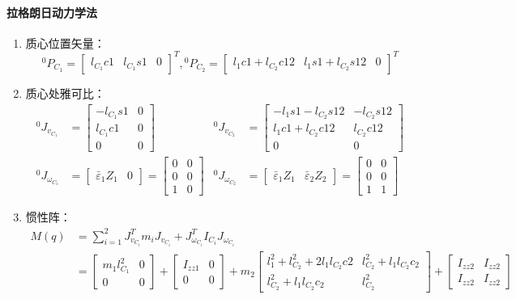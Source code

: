 \documentclass[
12pt, %
a4paper, 
oneside, %
headinclude,footinclude, %
]{scrartcl}
\begin{document}
{\paragraph{拉格朗日动力学法}
\begin{enumerate}
\item 质心位置矢量：
$$ {}^0 P_{C_1} = \begin{bmatrix} l_{C_1}c1 & l_{C_1}s1 & 0 \end{bmatrix}^T, {}^0 P_{C_2} = \begin{bmatrix} l_1 c1 + l_{C_2}c12 & l_1 s1 + l_{C_2}s12 & 0 \end{bmatrix}^T $$
\item 质心处雅可比：
\begin{align*}
{}^0 J_{v_{C_1}} &= \begin{bmatrix} -l_{C_1}s1 & 0 \\ l_{C_1}c1 & 0 \\ 0 & 0 \end{bmatrix}& {}^0 J_{v_{C_2}} &= \begin{bmatrix} -l_1 s1 - l_{C_2}s12 & -l_{C_2}s12 \\ l_1 c1 + l_{C_2}c12 & l_{C_2}c12 \\ 0 & 0 \end{bmatrix} \\
{}^0 J_{\omega_{C_1}} &= \begin{bmatrix} \bar{\varepsilon}_1 Z_1 & 0 \end{bmatrix} = \begin{bmatrix} 0 & 0 \\ 0 & 0 \\ 1 & 0 \end{bmatrix}& {}^0 J_{\omega_{C_2}} &= \begin{bmatrix} \bar{\varepsilon}_1 Z_1 & \bar{\varepsilon}_2 Z_2 \end{bmatrix} = \begin{bmatrix} 0 & 0 \\ 0 & 0 \\ 1 & 1 \end{bmatrix}
\end{align*}
\item 惯性阵：
\begin{align*}
M(q) &= \sum_{i = 1}^{2} J_{v_{C_i}}^T m_i J_{v_{C_i}} + J_{\omega_{C_i}}^T I_{C_i} J_{\omega_{C_i}} \\
&= \begin{bmatrix} m_1l_{C_1}^2 & 0 \\ 0 & 0 \end{bmatrix} + \begin{bmatrix} I_{zz1} & 0 \\ 0 & 0 \end{bmatrix} + m_2 \begin{bmatrix} l_1^2 + l_{C_2}^2 + 2l_1 l_{C_2}c2 & l_{C_2}^2 + l_1 l_{C_2}c_2 \\ l_{C_2}^2 + l_1 l_{C_2}c_2 & l_{C_2}^2 \end{bmatrix} + \begin{bmatrix} I_{zz2} & I_{zz2} \\ I_{zz2} & I_{zz2} \end{bmatrix} \\

\end{align*}
\end{enumerate}}
\end{document}
